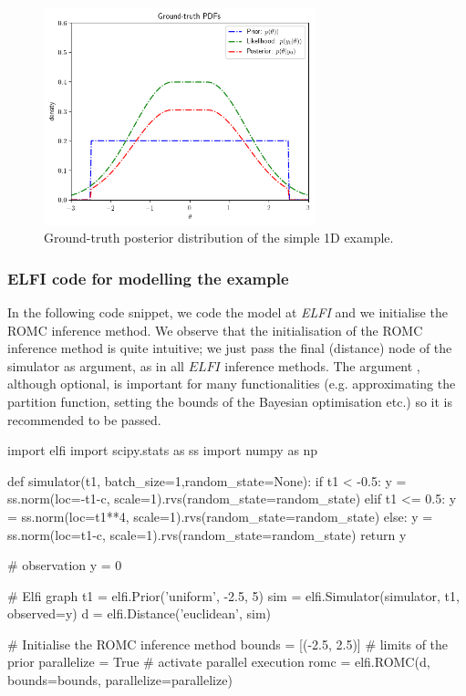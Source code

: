 \begin{figure}[h]
    \begin{center}
\includegraphics[width=0.7\textwidth]{./Thesis/images/chapter3/example_gt.png}
    \end{center}
  \caption[Ground-truth posterior distribution of the simple 1D
example.]{Ground-truth posterior distribution of the simple 1D
example.}
  \label{fig:example_gt}
\end{figure}

\subsubsection*{ELFI code for modelling the example}

In the following code snippet, we code the model at \textit{ELFI} and
we initialise the ROMC inference method. We observe that the
initialisation of the ROMC inference method is quite intuitive; we
just pass the final (distance) node of the simulator as argument, as
in all $\textit{ELFI}$ inference methods. The argument
, although optional, is important for many
functionalities (e.g. approximating the partition function, setting
the bounds of the Bayesian optimisation etc.) so it is recommended to
be passed.

\begin{pythoncode}
  import elfi import scipy.stats as ss
  import numpy as np
  
  def simulator(t1, batch_size=1,random_state=None):
      if t1 < -0.5:
          y = ss.norm(loc=-t1-c, scale=1).rvs(random_state=random_state)
      elif t1 <= 0.5:
          y = ss.norm(loc=t1**4, scale=1).rvs(random_state=random_state)
      else:
          y = ss.norm(loc=t1-c, scale=1).rvs(random_state=random_state)
      return y

  # observation
  y = 0
      
  # Elfi graph
  t1 = elfi.Prior('uniform', -2.5, 5)
  sim = elfi.Simulator(simulator, t1, observed=y)
  d = elfi.Distance('euclidean', sim)

  # Initialise the ROMC inference method
  bounds = [(-2.5, 2.5)] # limits of the prior
  parallelize = True # activate parallel execution
  romc = elfi.ROMC(d, bounds=bounds, parallelize=parallelize)
\end{pythoncode}


